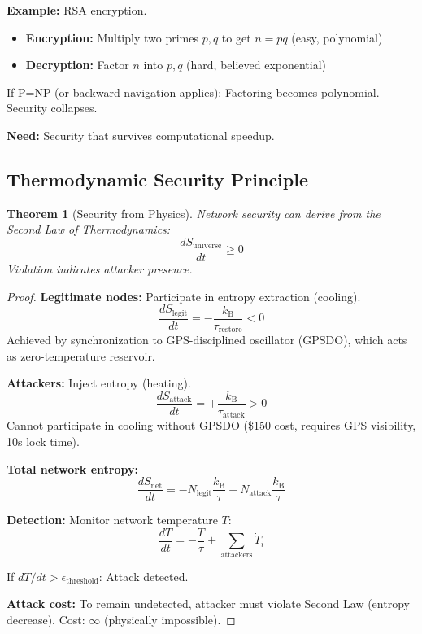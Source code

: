\documentclass[twocolumn,10pt]{article}
\newtheorem{theorem}{Theorem}[section]
\theoremstyle{definition}
\theoremstyle{remark}
\newcommand{\kB}{k_{\text{B}}}
\begin{document}
\textbf{Example:} RSA encryption.
\begin{itemize}
\item \textbf{Encryption:} Multiply two primes $p, q$ to get $n = pq$ (easy, polynomial)
\item \textbf{Decryption:} Factor $n$ into $p, q$ (hard, believed exponential)
\end{itemize}

If P=NP (or backward navigation applies): Factoring becomes polynomial. Security collapses.

\vspace{0.2cm}
\noindent\textbf{Need:} Security that survives computational speedup.

\subsection{Thermodynamic Security Principle}

\begin{theorem}[Security from Physics]
\label{thm:thermo_security}
Network security can derive from the Second Law of Thermodynamics:
\begin{equation}
\frac{dS_{\text{universe}}}{dt} \geq 0
\end{equation}
Violation indicates attacker presence.
\end{theorem}

\begin{proof}
\textbf{Legitimate nodes:} Participate in entropy extraction (cooling).
\begin{equation}
\frac{dS_{\text{legit}}}{dt} = -\frac{\kB}{\tau_{\text{restore}}} < 0
\end{equation}
Achieved by synchronization to GPS-disciplined oscillator (GPSDO), which acts as zero-temperature reservoir.

\vspace{0.2cm}
\noindent\textbf{Attackers:} Inject entropy (heating).
\begin{equation}
\frac{dS_{\text{attack}}}{dt} = +\frac{\kB}{\tau_{\text{attack}}} > 0
\end{equation}
Cannot participate in cooling without GPSDO (\$150 cost, requires GPS visibility, 10s lock time).

\vspace{0.2cm}
\noindent\textbf{Total network entropy:}
\begin{equation}
\frac{dS_{\text{net}}}{dt} = -N_{\text{legit}} \frac{\kB}{\tau} + N_{\text{attack}} \frac{\kB}{\tau}
\end{equation}

\textbf{Detection:} Monitor network temperature $T$:
\begin{equation}
\frac{dT}{dt} = -\frac{T}{\tau} + \sum_{\text{attackers}} \dot{T}_i
\end{equation}

If $dT/dt > \epsilon_{\text{threshold}}$: Attack detected.

\vspace{0.2cm}
\noindent\textbf{Attack cost:} To remain undetected, attacker must violate Second Law (entropy decrease). Cost: $\infty$ (physically impossible).
\end{proof}
\end{document}
